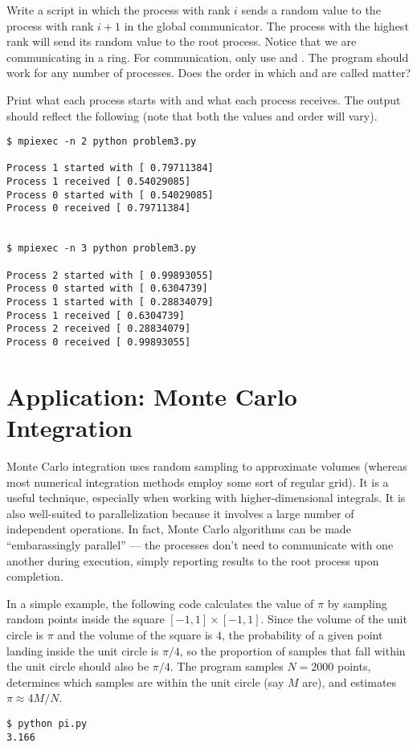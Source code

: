 \begin{problem}
Write a script in which the process with rank $i$ sends a random value to the process with rank $i+1$ in the global communicator.
The process with the highest rank will send its random value to the root process.
Notice that we are communicating in a ring.
For communication, only use  and .
The program should work for any number of processes.
Does the order in which  and  are called matter?

Print what each process starts with and what each process receives.
The output should reflect the following (note that both the values and order will vary).
\begin{lstlisting}[style=ShellOutput]
$ mpiexec -n 2 python problem3.py

Process 1 started with [ 0.79711384]
Process 1 received [ 0.54029085]
Process 0 started with [ 0.54029085]
Process 0 received [ 0.79711384]


$ mpiexec -n 3 python problem3.py

Process 2 started with [ 0.99893055]
Process 0 started with [ 0.6304739]
Process 1 started with [ 0.28834079]
Process 1 received [ 0.6304739]
Process 2 received [ 0.28834079]
Process 0 received [ 0.99893055]
\end{lstlisting}
\end{problem}

\section*{Application: Monte Carlo Integration}

Monte Carlo integration uses random sampling to approximate volumes (whereas most numerical integration methods employ some sort of regular grid).
It is a useful technique, especially when working with higher-dimensional integrals.
It is also well-suited to parallelization because it involves a large number of independent operations.
In fact, Monte Carlo algorithms can be made ``embarassingly parallel'' --- the processes don't need to communicate with one another during execution, simply reporting results to the root process upon completion.

In a simple example, the following code calculates the value of $\pi$ by sampling random points inside the square $[-1,1]\times[-1,1]$.
Since the volume of the unit circle is $\pi$ and the volume of the square is $4$, the probability of a given point landing inside the unit circle is $\pi/4$, so the proportion of samples that fall within the unit circle should also be $\pi/4$.
The program samples $N = 2000$ points, determines which samples are within the unit circle (say $M$ are), and estimates $\pi\approx 4M/N$.

\begin{lstlisting}
$ python pi.py
3.166
\end{lstlisting}

